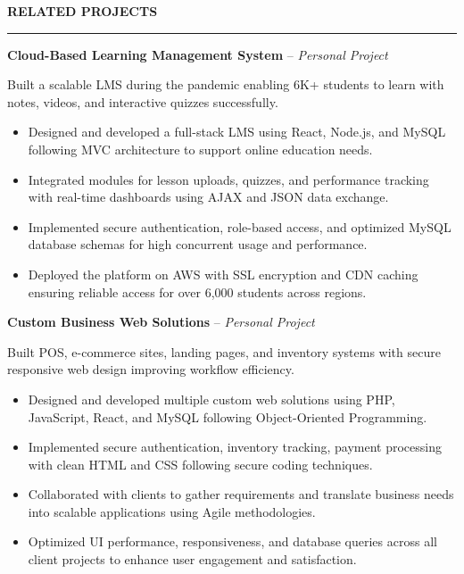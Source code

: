 \documentclass[10pt,letterpaper]{article}
\begin{document}
\vspace{6pt}

\textbf{RELATED PROJECTS}\\[-8pt]
\noindent\rule{\textwidth}{1pt}

\vspace{-2pt}

\textbf{Cloud-Based Learning Management System} -- \emph{Personal Project}

\vspace{-1pt}

Built a scalable LMS during the pandemic enabling 6K+ students to learn with notes, videos, and interactive quizzes successfully.
\vspace{-1pt}
\begin{itemize}
\item Designed and developed a full-stack LMS using React, Node.js, and MySQL following MVC architecture to support online education needs.
\item Integrated modules for lesson uploads, quizzes, and performance tracking with real-time dashboards using AJAX and JSON data exchange.
\item Implemented secure authentication, role-based access, and optimized MySQL database schemas for high concurrent usage and performance.
\item Deployed the platform on AWS with SSL encryption and CDN caching ensuring reliable access for over 6,000 students across regions.
\end{itemize}

\textbf{Custom Business Web Solutions} -- \emph{Personal Project}

\vspace{-1pt}

Built POS, e-commerce sites, landing pages, and inventory systems with secure responsive web design improving workflow efficiency.
\vspace{-1pt}
\begin{itemize}
\item Designed and developed multiple custom web solutions using PHP, JavaScript, React, and MySQL following Object-Oriented Programming.
\item Implemented secure authentication, inventory tracking, payment processing with clean HTML and CSS following secure coding techniques.
\item Collaborated with clients to gather requirements and translate business needs into scalable applications using Agile methodologies.
\item Optimized UI performance, responsiveness, and database queries across all client projects to enhance user engagement and satisfaction.
\end{itemize}
\end{document}
